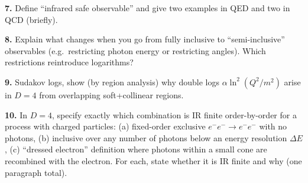 \documentclass[11pt]{article}
\begin{document}
\begin{tcolorbox}[problem]
\textbf{7.} Define ``infrared safe observable'' and give two examples in QED and two in QCD (briefly).
\end{tcolorbox}

\begin{tcolorbox}[problem]
\textbf{8.} Explain what changes when you go from fully inclusive to ``semi-inclusive'' observables (e.g.\ restricting photon energy or restricting angles). Which restrictions reintroduce logarithms?
\end{tcolorbox}

\begin{tcolorbox}[problem]
\textbf{9.} Sudakov logs, show (by region analysis) why double logs $\alpha\ln^2(Q^2/m^2)$ arise in $D=4$ from overlapping soft+collinear regions.
\end{tcolorbox}

\begin{tcolorbox}[problem]
\textbf{10.} In $D=4$, specify exactly which combination is IR finite order-by-order for a process with charged particles: (a) fixed-order exclusive $e^-e^-\to e^-e^-$ with no photons, (b) inclusive over any number of photons below an energy resolution $\Delta E$, (c) ``dressed electron'' definition where photons within a small cone are recombined with the electron. For each, state whether it is IR finite and why (one paragraph total).
\end{tcolorbox}
\end{document}
